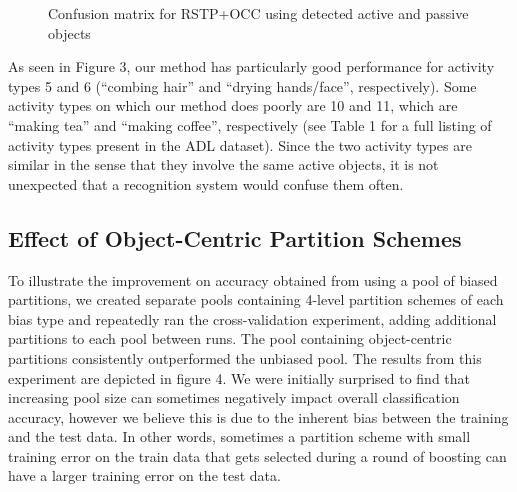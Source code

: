 \documentclass{bmvc2k}
\begin{document}
  
  \begin{figure}
  \begin{center}
		   \caption{Confusion matrix for RSTP+OCC using detected active and
       passive objects}
  \label{fig:teaser}
  \end{center}
  \end{figure}
 	As seen in Figure 3, our method has particularly good
  performance for activity types 5 and 6 (``combing hair'' and ``drying
  hands/face'', respectively). Some activity types on which our method does
  poorly are 10 and 11, which are ``making tea'' and ``making coffee'',
  respectively (see Table 1 for a full listing of activity types present in
  the ADL dataset). Since the two activity types are similar in the sense that
  they involve the same active objects, it is not
  unexpected that a recognition system would confuse them often.
   
  \subsection{Effect of Object-Centric Partition Schemes}
	

  To illustrate the improvement on accuracy obtained from using a pool of
  biased partitions, we created separate pools containing 4-level
  partition schemes of each bias type and
  repeatedly ran the cross-validation experiment, adding additional
  partitions to each pool between runs. The pool containing object-centric partitions 
  consistently outperformed the unbiased pool.
  The
  results from this experiment are depicted in figure 4. We were initially
  surprised to find that increasing pool size can
  sometimes negatively impact overall classification accuracy, however we
  believe this is due to the inherent bias between the training and the test
  data. In other words, sometimes a partition scheme with small training error
  on the train data that gets selected during a round of boosting can have a
  larger training error on the test data. 
 
\end{document}
